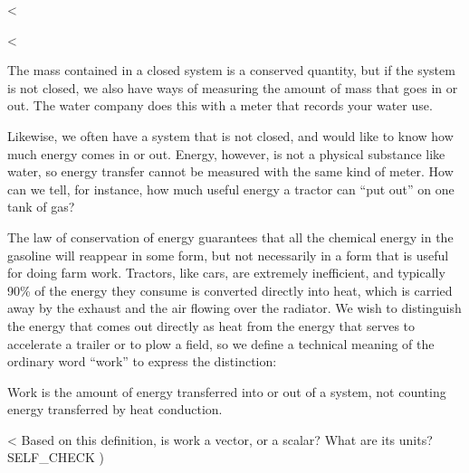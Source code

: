 <%

  <%

The mass contained in a closed system is a conserved
quantity, but if the system is not closed, we also have ways
of measuring the amount of mass that goes in or out. The
water company does this with a meter that records your water use.

Likewise, we often
have a system that is not closed, and
would like to know how much energy comes in or out.
Energy, however, is not a physical substance
like water, so energy transfer cannot be measured with the
same kind of meter. How can we tell, for instance, how much
useful energy a tractor can ``put out'' on one tank of gas?

The law of conservation of energy guarantees that all the
chemical energy in the gasoline will reappear in some form,
but not necessarily in a form that is useful for doing farm
work. Tractors, like cars, are extremely inefficient, and
typically 90\% of the energy they consume is converted
directly into heat, which is carried away by the exhaust and
the air flowing over the radiator. We wish to distinguish
the energy that comes out directly as heat from the energy
that serves to accelerate a trailer or to plow a field, so
we define a technical meaning of the ordinary word
``work'' to express the distinction:

\begin{lessimportant}
Work is the amount of energy transferred into or out of a system,
not counting energy transferred by heat conduction.
\end{lessimportant}

<%
Based on this definition, is work a vector, or a scalar? What are its units?
  SELF_CHECK
  ) %

